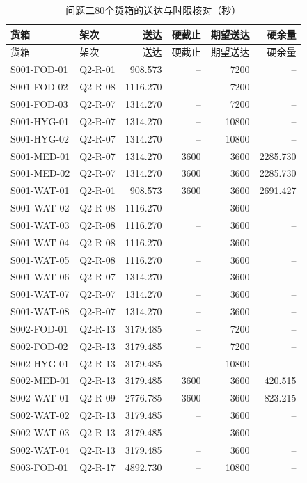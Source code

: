 \documentclass[withoutpreface,colorprint]{format}
\numberwithin{equation}{section}
\numberwithin{figure}{section}
\numberwithin{table}{section}
\begin{document}
\begin{longtable}{@{}llrrrr@{}}
\caption{问题二80个货箱的送达与时限核对（秒）}\label{tab:app_deliveries}\\
\toprule
货箱 & 架次 & 送达 & 硬截止 & 期望送达 & 硬余量\\
\midrule
\endfirsthead
\toprule
货箱 & 架次 & 送达 & 硬截止 & 期望送达 & 硬余量\\
\midrule
\endhead
S001-FOD-01 & Q2-R-01 & 908.573 & -- & 7200 & --\\
S001-FOD-02 & Q2-R-08 & 1116.270 & -- & 7200 & --\\
S001-FOD-03 & Q2-R-07 & 1314.270 & -- & 7200 & --\\
S001-HYG-01 & Q2-R-07 & 1314.270 & -- & 10800 & --\\
S001-HYG-02 & Q2-R-07 & 1314.270 & -- & 10800 & --\\
S001-MED-01 & Q2-R-07 & 1314.270 & 3600 & 3600 & 2285.730\\
S001-MED-02 & Q2-R-07 & 1314.270 & 3600 & 3600 & 2285.730\\
S001-WAT-01 & Q2-R-01 & 908.573 & 3600 & 3600 & 2691.427\\
S001-WAT-02 & Q2-R-08 & 1116.270 & -- & 3600 & --\\
S001-WAT-03 & Q2-R-08 & 1116.270 & -- & 3600 & --\\
S001-WAT-04 & Q2-R-08 & 1116.270 & -- & 3600 & --\\
S001-WAT-05 & Q2-R-08 & 1116.270 & -- & 3600 & --\\
S001-WAT-06 & Q2-R-07 & 1314.270 & -- & 3600 & --\\
S001-WAT-07 & Q2-R-07 & 1314.270 & -- & 3600 & --\\
S001-WAT-08 & Q2-R-07 & 1314.270 & -- & 3600 & --\\
S002-FOD-01 & Q2-R-13 & 3179.485 & -- & 7200 & --\\
S002-FOD-02 & Q2-R-13 & 3179.485 & -- & 7200 & --\\
S002-HYG-01 & Q2-R-13 & 3179.485 & -- & 10800 & --\\
S002-MED-01 & Q2-R-13 & 3179.485 & 3600 & 3600 & 420.515\\
S002-WAT-01 & Q2-R-09 & 2776.785 & 3600 & 3600 & 823.215\\
S002-WAT-02 & Q2-R-13 & 3179.485 & -- & 3600 & --\\
S002-WAT-03 & Q2-R-13 & 3179.485 & -- & 3600 & --\\
S002-WAT-04 & Q2-R-13 & 3179.485 & -- & 3600 & --\\
S003-FOD-01 & Q2-R-17 & 4892.730 & -- & 10800 & --\\

\end{longtable}
\end{document}
